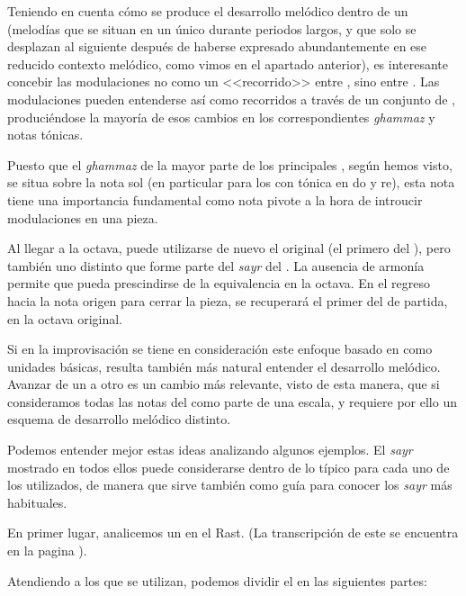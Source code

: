 Teniendo en cuenta cómo se produce el desarrollo melódico dentro de un \maqam (melodías que se situan en un único \yins durante periodos largos, y que solo se desplazan al siguiente después de haberse expresado abundantemente en ese reducido contexto melódico, como vimos en el apartado anterior), es interesante concebir las modulaciones no como un <<recorrido>> entre \maqamaatb, sino entre \ashnas. Las modulaciones pueden entenderse así como recorridos a través de un conjunto de \ashnas, produciéndose la mayoría de esos cambios en los correspondientes \emph{ghammaz} y notas tónicas.

Puesto que el \emph{ghammaz} de la mayor parte de los principales \maqamaatb, según hemos visto, se situa sobre la nota sol (en particular para los \maqamaat con tónica en do y re), esta nota tiene una importancia fundamental como nota pivote a la hora de introucir modulaciones en una pieza.

Al llegar a la octava, puede utilizarse de nuevo el \yins original (el primero del \maqamb), pero también uno distinto que forme parte del \emph{sayr} del \maqamb. La ausencia de armonía permite que pueda prescindirse de la equivalencia en la octava. En el regreso hacia la nota origen para cerrar la pieza, se recuperará el primer \yins del \maqam de partida, en la octava original.

Si en la improvisación se tiene en consideración este enfoque basado en \yins como unidades básicas, resulta también más natural entender el desarrollo melódico. Avanzar de un \yins a otro es un cambio más relevante, visto de esta manera, que si consideramos todas las notas del \maqam como parte de una escala, y requiere por ello un esquema de desarrollo melódico distinto.

Podemos entender mejor estas ideas analizando algunos ejemplos. El \emph{sayr} mostrado en todos ellos puede considerarse dentro de lo típico para cada uno de los \maqamaat utilizados, de manera que sirve también como guía para conocer los \emph{sayr} más habituales.

En primer lugar, analicemos un \taqsim en el \maqam Rast. (La transcripción de este \taqsim se encuentra en la pagina \pageref{taqsimrast}).


Atendiendo a los \yins que se utilizan, podemos dividir el \taqsim en las siguientes partes:

